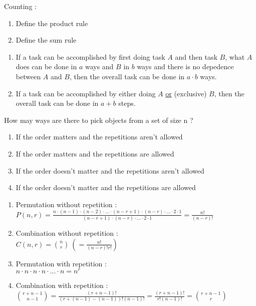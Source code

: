 \documentclass[12pt]{article}
\newcommand*{\xfield}[1]{\begin{mdframed}\centering #1\end{mdframed}\bigskip}
\newenvironment{note}{}{}
\begin{document}
\begin{note}
Counting :
	\xfield{\begin{enumerate}
		\item Define the product rule
		\item Define the sum rule
	\end{enumerate} }
	\xfield{\begin{enumerate}
		\item If a task can be accomplished by first doing task $A$ and then task $B$, what $A$ does can be done in $a$ ways and $B$ in $b$ ways and there is no depedence between $A$ and $B$, then the overall task can be done in $a\cdot b$ ways. 
		\item If a task can be accomplished by either doing $A$ \underline{or} (exclusive) $B$, then the overall task can be done in $a+b$ steps.
	\end{enumerate} }
\end{note}

\begin{note}
	\xfield{How may ways are there to pick objects from a set of size n ?\begin{enumerate}
		\item If the order matters and the repetitions aren't allowed
		\item If the order matters and the repetitions are allowed
		\item If the order doesn't matter and the repetitions aren't allowed
		\item If the order doesn't matter and the repetitions are allowed
	\end{enumerate} }
	\xfield{\begin{enumerate}
		\item Permutation without repetition :\\
			$P(n,r) = \frac{n\cdot(n-1)\cdot(n-2)\cdot ...\cdot(n-r+1)\cdot(n-r)\cdot ...\cdot 2\cdot 1}{(n-r+1)\cdot (n-r)\cdot ... \cdot 2 \cdot 1} = \frac{n!}{(n-r)!}$
		\item Combination without repetition :\\
		$C(n,r) = \binom{n}{r}\ (=\frac{n!}{(n-r)!r!})$
		\item Permutation with repetition :\\
		$n\cdot n\cdot n \cdot n \cdot ... \cdot n = n^r$
		\item Combination with repetition :\\
		$\binom{r+n-1}{n-1} = \frac{(r+n-1)!}{(r+(n-1)-(n-1))!(n-1)!} = \frac{(r+n-1)!}{r!(n-1)!} = \binom{r+n-1}{r}$
	\end{enumerate} }
\end{note}
\end{document}
